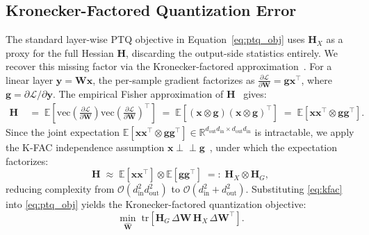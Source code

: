 \documentclass{article} %
\begin{document}
\vspace{-2mm}
\subsection{Kronecker-Factored Quantization Error}
\label{sec:method:kfac}

The standard layer-wise PTQ objective in Equation~\eqref{eq:ptq_obj} uses $\mathbf{H}_X$ as a proxy for the full Hessian $\mathbf{H}$, discarding the output-side statistics entirely. We recover this missing factor via the Kronecker-factored approximation~\citep{martens2015optimizing,van2023llm}. For a linear layer $\mathbf{y} = \mathbf{W}\mathbf{x}$, the per-sample gradient factorizes as $\frac{\partial \mathcal{L}}{\partial \mathbf{W}} = \mathbf{g}\mathbf{x}^\top$, where $\mathbf{g} = \partial\mathcal{L}/\partial\mathbf{y}$. The empirical Fisher approximation of $\mathbf{H}$~\citep{kunstner2019limitations} gives:
\begin{align}
    \mathbf{H}
    &\;=\; \mathbb{E}\!\left[
        \mathrm{vec}\!\left(\frac{\partial \mathcal{L}}{\partial \mathbf{W}}\right)
        \mathrm{vec}\!\left(\frac{\partial \mathcal{L}}{\partial \mathbf{W}}\right)^\top
    \right]
    \;=\; \mathbb{E}\!\left[
        (\mathbf{x} \otimes \mathbf{g})(\mathbf{x} \otimes \mathbf{g})^\top
    \right]
    \;=\; \mathbb{E}\!\left[
        \mathbf{x}\mathbf{x}^\top \otimes \mathbf{g}\mathbf{g}^\top
    \right].
    \label{eq:fisher_exact}
\end{align}
Since the joint expectation $\mathbb{E}[\mathbf{x}\mathbf{x}^\top \otimes \mathbf{g}\mathbf{g}^\top] \in \mathbb{R}^{d_{\mathrm{out}}d_{\mathrm{in}} \times d_{\mathrm{out}}d_{\mathrm{in}}}$ is intractable, we apply the K-FAC independence assumption $\mathbf{x} \perp\!\!\!\perp \mathbf{g}$~\citep{martens2015optimizing,botev2017practical}, under which the expectation factorizes:
\begin{equation}
    \mathbf{H} \;\approx\; \mathbb{E}[\mathbf{x}\mathbf{x}^\top] \otimes
    \mathbb{E}[\mathbf{g}\mathbf{g}^\top]
    \;=:\; \mathbf{H}_X \otimes \mathbf{H}_G,
    \label{eq:kfac}
\end{equation}
reducing complexity from $\mathcal{O}(d_{\mathrm{in}}^2 d_{\mathrm{out}}^2)$ to $\mathcal{O}(d_{\mathrm{in}}^2 + d_{\mathrm{out}}^2)$. Substituting \eqref{eq:kfac} into \eqref{eq:ptq_obj} yields the Kronecker-factored quantization objective:
\begin{equation}
    \min_{\widehat{\mathbf{W}}} \;
    \mathrm{tr}\!\left[\mathbf{H}_G\,\Delta\mathbf{W}\,\mathbf{H}_X\,
    \Delta\mathbf{W}^\top\right].
    \label{eq:kron_obj}
\end{equation}
\end{document}
